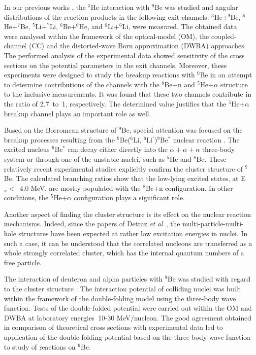 \documentclass[
12pt, %
oneside, %
english, %
onehalfspacing, %
headsepline, %
]{MastersDoctoralThesis} %
\begin{document}
In our previous works \cite{lukyanov2014, lukyanov2015, janseitov2018}, the ${}^3$He interaction with ${}^9$Be was studied and angular distributions of the reaction products in the following exit channels: ${}^3$He+$^9$Be, ${}^5$He+$^7$Be, ${}^5$Li+$^7$Li, ${}^6$Be+$^6$He, and ${}^6$Li+$^6$Li, were measured. The obtained data were analysed within the framework of the optical-model (OM), the coupled-channel (CC) and the distorted-wave Born approximation (DWBA) approaches. The performed analysis of the experimental data showed sensitivity of the cross sections on the potential parameters in the exit channels. Moreover, these experiments were designed to study the breakup reactions with ${}^9$Be in an attempt to determine contributions of the channels with the ${}^8$Be+n  and  ${}^5$He+$\alpha$ structure to the inclusive measurements. It was found that these two channels contribute in the ratio of 2.7~to~1, respectively. The determined value justifies that the ${}^5$He+$\alpha$ breakup channel plays an important role as well.

Based on the Borromean structure of ${}^9$Be, special attention was focused on the breakup processes resulting from the ${}^9$Be($^6$Li, ${}^6$Li$^\prime$)$^9$Be$^*$ nuclear reaction \cite{brown2007, papka2007}. The excited nucleus ${}^9$Be$^*$ can decay either directly into the $\alpha+\alpha+n$ three-body system or through one of the unstable nuclei, such as ${}^5$He and ${}^8$Be. These relatively recent experimental studies explicitly confirm the cluster structure of ${}^9$Be.
The calculated branching ratios show that the low-lying excited states, at E$_x <$~4.0 MeV, are mostly populated with the ${}^8$Be+n configuration. In other conditions, the ${}^5$He+$\alpha$ configuration plays a significant  role.

Another aspect of finding the cluster structure is its  effect on the nuclear reaction mechanisms. Indeed, since the papers of Detraz \textit{et al}~\cite{detraz1970, detraz1974}, the multi-particle-multi-hole structures have been expected at rather low excitation energies in nuclei. In such a case, it can be understood that the correlated nucleons are transferred as a whole strongly correlated cluster, which has the internal quantum numbers of a free particle.

The interaction of deuteron and alpha particles with ${}^9$Be was studied with regard to the cluster structure \cite{urazbekov2016, urazbekov2017}. The interaction potential of colliding nuclei was built within the framework of the double-folding model using the three-body wave function. Tests of the double-folded potential were carried out within the OM and DWBA at laboratory energies $~$10-30 MeV/nucleon. The good agreement obtained in comparison of theoretical cross sections with experimental data led to application of the double-folding potential based on the three-body wave function to study of reactions on $^9$Be.
\end{document}

